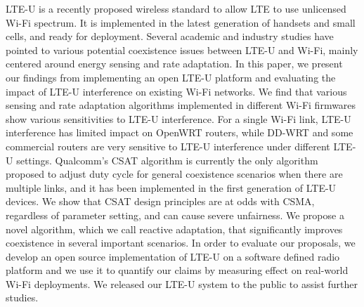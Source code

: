 LTE-U is a recently proposed wireless standard to
allow LTE to use unlicensed Wi-Fi spectrum. It is implemented
in the latest generation of handsets and small cells, and ready for
deployment. Several academic and industry studies have pointed
to various potential coexistence issues between LTE-U and Wi-Fi,
mainly centered around energy sensing and rate adaptation. 
In this paper, we present our findings from implementing 
an open LTE-U platform and evaluating the impact 
of LTE-U interference on existing Wi-Fi networks.
We find that various sensing and rate adaptation algorithms
implemented in different Wi-Fi firmwares show 
various sensitivities to LTE-U interference. 
For a single Wi-Fi link, 
LTE-U interference has limited impact on OpenWRT routers, while
DD-WRT and some commercial routers are very sensitive to 
LTE-U interference under different LTE-U settings. 
Qualcomm’s CSAT algorithm is currently
the only algorithm proposed to adjust duty cycle for general
coexistence scenarios when there are multiple links, and it has been
implemented in the first generation of LTE-U devices. We show
that CSAT design principles are at odds with CSMA, regardless
of parameter setting, and can cause severe unfairness. We
propose a novel algorithm, which we call reactive adaptation, that
significantly improves coexistence in several important scenarios.
In order to evaluate our
proposals, we develop an open source implementation of LTE-U
on a software defined radio platform and we use it to quantify our
claims by measuring effect on real-world Wi-Fi deployments. We
released our LTE-U system to the public to assist further studies.








